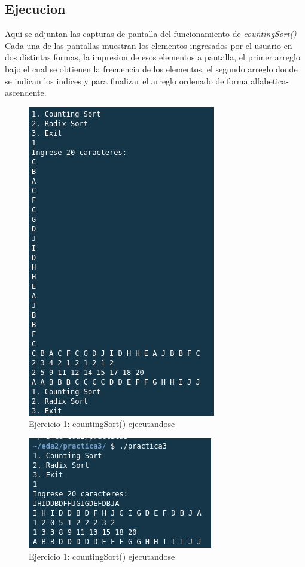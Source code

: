 \documentclass{article}
\begin{document}
			\subsection{Ejecucion}
			
			Aqui se adjuntan las capturas de pantalla del funcionamiento de \emph{countingSort()}\\
			
			Cada una de las pantallas muestran los elementos ingresados por el usuario en dos distintas formas, la impresion de esos elementos a pantalla, el primer arreglo bajo el cual se obtienen la frecuencia de los elementos, el segundo arreglo donde se indican los indices y para finalizar el arreglo ordenado de forma alfabetica-ascendente.
			
			\begin{figure}[H]
				\centering
				\includegraphics[scale = 1]{images/E12.png}
				\caption*{Ejercicio 1: countingSort() ejecutandose}
			\end{figure}
			
			\begin{figure}[H]
				\centering
				\includegraphics[scale = 1]{images/E11.png}
				\caption*{Ejercicio 1: countingSort() ejecutandose}
			\end{figure}	 
		
\end{document}
